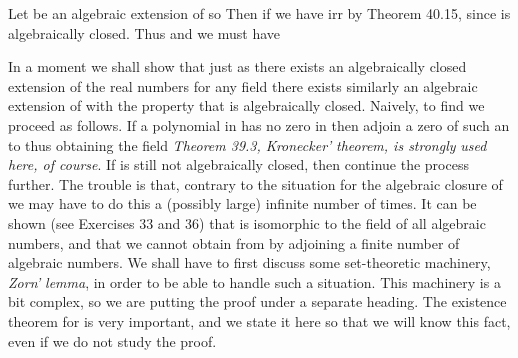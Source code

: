 \documentclass[11pt,oneside]{article}
\begin{document}
\begin{BookBody}
 Let  be an algebraic extension of  so  Then if  we have irr  by Theorem 40.15, since  is algebraically closed. Thus  and we must have \BookEnd{\blacklozenge}

In a moment we shall show that just as there exists an algebraically closed extension  of the real numbers  for any field  there exists similarly an algebraic extension  of  with the property that  is algebraically closed. Naively, to find  we proceed 
as follows. If a polynomial  in  has no zero in  then adjoin a zero \BookInline{\alpha } of such an  to  thus obtaining the field  \textit{Theorem 39.3, Kronecker’} \textit{theorem, is strongly} \textit{used here, of course}. If  is still not algebraically closed, then continue the process further. The trouble is that, contrary to the situation for the algebraic closure  of  we may have to do this a (possibly large) infinite number of times. It can be shown (see Exercises 33 and 36) that  is isomorphic to the field of all algebraic numbers, and that we cannot obtain  from  by adjoining a finite number of algebraic numbers. We shall have to first discuss some set-theoretic machinery,\textit{ Zorn’} \textit{lemma}, in order to be able to handle such a situation. This machinery is a bit complex, so we are putting the proof under a separate heading. The existence theorem for  is very important, and we state it here so that we will know this fact, even if we do not study the proof.

\end{BookBody}

\BookNarrativetrue
\end{document}
